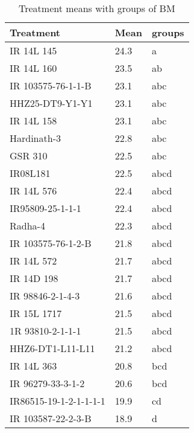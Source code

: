 \documentclass[]{article}
\begin{document}
\begin{longtable}{lll}
\caption{\label{tab:two-fac-groups-tab2}Treatment means with groups of BM}\\
\toprule
Treatment & Mean & groups\\
\midrule
\rowcolor{gray!6}  IR 14L 145 & 24.3 & a\\
IR 14L 160 & 23.5 & ab\\
\rowcolor{gray!6}  IR 103575-76-1-1-B & 23.1 & abc\\
HHZ25-DT9-Y1-Y1 & 23.1 & abc\\
\rowcolor{gray!6}  IR 14L 158 & 23.1 & abc\\
\addlinespace
Hardinath-3 & 22.8 & abc\\
\rowcolor{gray!6}  GSR 310 & 22.5 & abc\\
IR08L181 & 22.5 & abcd\\
\rowcolor{gray!6}  IR 14L 576 & 22.4 & abcd\\
IR95809-25-1-1-1 & 22.4 & abcd\\
\addlinespace
\rowcolor{gray!6}  Radha-4 & 22.3 & abcd\\
IR 103575-76-1-2-B & 21.8 & abcd\\
\rowcolor{gray!6}  IR 14L 572 & 21.7 & abcd\\
IR 14D 198 & 21.7 & abcd\\
\rowcolor{gray!6}  IR 98846-2-1-4-3 & 21.6 & abcd\\
\addlinespace
IR 15L 1717 & 21.5 & abcd\\
\rowcolor{gray!6}  1R 93810-2-1-1-1 & 21.5 & abcd\\
HHZ6-DT1-L11-L11 & 21.2 & abcd\\
\rowcolor{gray!6}  IR 14L 363 & 20.8 & bcd\\
IR 96279-33-3-1-2 & 20.6 & bcd\\
\addlinespace
\rowcolor{gray!6}  IR86515-19-1-2-1-1-1-1 & 19.9 & cd\\
IR 103587-22-2-3-B & 18.9 & d\\
\bottomrule
\end{longtable}
\endgroup{}
\begingroup\fontsize{12}{14}\selectfont
\end{document}
